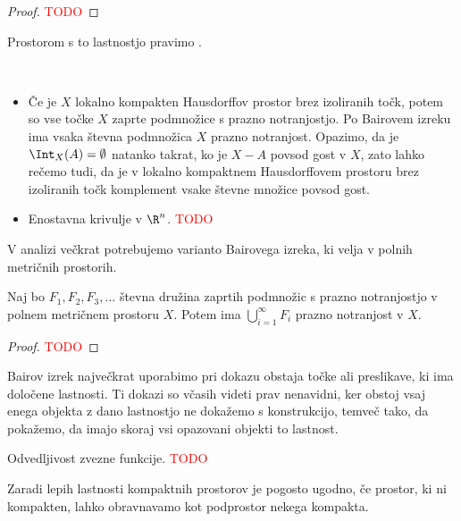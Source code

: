 \begin{proof}
    \textcolor{red}{TODO}
\end{proof}

\begin{definicija}
    Prostorom s to lastnostjo pravimo .
\end{definicija}

\newpage
\begin{primer}
    \
    \begin{itemize}
        \item Če je $X$ lokalno kompakten Hausdorffov prostor brez izoliranih točk, potem so vse točke $X$ zaprte podmnožice s prazno notranjostjo. Po Bairovem izreku ima vsaka števna podmnožica $X$ prazno notranjost. Opazimo, da je $\Int_X(A) = \emptyset$ natanko takrat, ko je $X - A$ povsod gost v $X$, zato lahko rečemo tudi, da je v lokalno kompaktnem Hausdorffovem prostoru brez izoliranih točk komplement vsake števne množice povsod gost.
        \item Enostavna krivulje v \(\R^n\). \textcolor{red}{TODO}
    \end{itemize}
\end{primer}

V analizi večkrat potrebujemo varianto Bairovega izreka, ki velja v polnih metričnih prostorih.

\begin{izrek}
    Naj bo $F_1, F_2, F_3, \ldots$ števna družina zaprtih podmnožic s prazno notranjostjo v polnem metričnem prostoru $X$. Potem ima $\bigcup_{i=1}^\infty F_i$ prazno notranjost v $X$. 
\end{izrek}

\begin{proof}
    \textcolor{red}{TODO}
\end{proof}

Bairov izrek največkrat uporabimo pri dokazu obstaja točke ali preslikave, ki ima določene lastnosti. Ti dokazi so včasih videti prav nenavidni, ker obstoj vsaj enega objekta z dano lastnostjo ne dokažemo s konstrukcijo, temveč tako, da pokažemo, da imajo skoraj vsi opazovani objekti to lastnost.

\begin{primer}
    Odvedljivost zvezne funkcije. \textcolor{red}{TODO}
\end{primer}

Zaradi lepih lastnosti kompaktnih prostorov je pogosto ugodno, če prostor, ki ni kompakten, lahko obravnavamo kot podprostor nekega kompakta.

